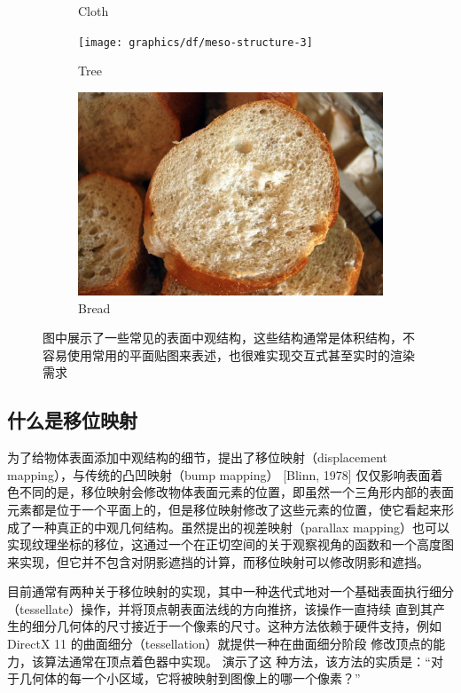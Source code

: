 \begin{figure}
\begin{fullwidth}
\begin{subfigure}[t]{.285\thewidth}
		\caption{Cloth}
	\end{subfigure}
	\begin{subfigure}[t]{.23\thewidth}
		\texttt{[image: graphics/df/meso-structure-3]}
		\caption{Tree}
	\end{subfigure}
	\begin{subfigure}[t]{.26\thewidth}
		\includegraphics[width=\textwidth]{graphics/df/meso-structure-4}
		\caption{Bread}
	\end{subfigure}
	\caption{图中展示了一些常见的表面中观结构，这些结构通常是体积结构，不容易使用常用的平面贴图来表述，也很难实现交互式甚至实时的渲染需求}
	\label{f:df-meso-structure}
\end{fullwidth}
\end{figure}

\subsection{什么是移位映射}
为了给物体表面添加中观结构的细节，\cite{a:Shade-Trees}提出了移位映射（displacement mapping），与传统的凸凹映射（bump mapping）\cite{a:SimulationofWrinkledSurfaces} [Blinn, 1978] 仅仅影响表面着色不同的是，移位映射会修改物体表面元素的位置，即虽然一个三角形内部的表面元素都是位于一个平面上的，但是移位映射修改了这些元素的位置，使它看起来形成了一种真正的中观几何结构。虽然\cite{a:DetailedShapeRepresentationwithParallaxMapping}提出的视差映射（parallax mapping）也可以实现纹理坐标的移位，这通过一个在正切空间的关于观察视角的函数和一个高度图来实现，但它并不包含对阴影遮挡的计算，而移位映射可以修改阴影和遮挡。 

目前通常有两种关于移位映射的实现，其中一种迭代式地对一个基础表面执行细分（tessellate）操作，并将顶点朝表面法线的方向推挤，该操作一直持续 直到其产生的细分几何体的尺寸接近于一个像素的尺寸。这种方法依赖于硬件支持，例如DirectX 11 的曲面细分（tessellation）就提供一种在曲面细分阶段 修改顶点的能力，该算法通常在顶点着色器中实现。\cite{a:AdaptiveTessellationofSubdivisionSurfaceswithDisplacementMapping} 演示了这 种方法，该方法的实质是：“对于几何体的每一个小区域，它将被映射到图像上的哪一个像素？” 

